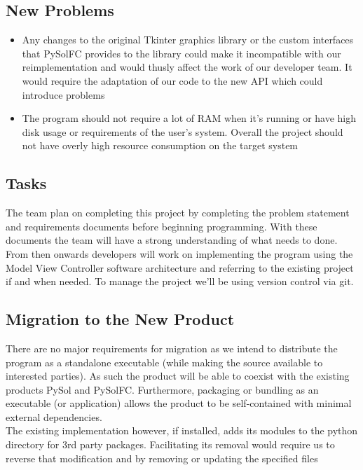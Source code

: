 \documentclass{article}
\begin{document}
		\subsection{New Problems}
		\begin{itemize}
		\itemsep0em	
			\item Any changes to the original Tkinter graphics library or the 
			custom interfaces that PySolFC provides to the library could make it
			incompatible with our reimplementation and would thusly affect the work of
			our developer team. It would require the adaptation of our code to the new
			API which could introduce problems
			\item The program should not require a lot of RAM when it’s running or
			have high disk usage or requirements of the user’s system. Overall the
			project should not have overly high resource consumption on the target system\\
		\end{itemize}
		\subsection{Tasks}
			\indent The team plan on completing this project by completing the problem
			statement and requirements documents before beginning programming. With these
			documents the team will have a strong understanding of what needs to done.
			From then onwards developers will work on implementing the program using
			the Model View Controller software architecture and referring to the existing
			project if and when needed. To manage the project we’ll be using version
			control via git.\\


		\subsection{Migration to the New Product}
			\indent There are no major requirements for migration as we intend to
			distribute the program as a standalone executable (while making the source
			available to interested parties). As such the product will be able to coexist
			with the existing products PySol and PySolFC. Furthermore, packaging
			or bundling as an executable (or application) allows the product to be
			self-contained with minimal external dependencies.\\
			\indent The existing implementation however, if installed, adds its modules
			to the python directory for 3rd party packages. Facilitating its removal
			would require us to reverse that modification and by removing or updating
			the specified files\\
\end{document}
